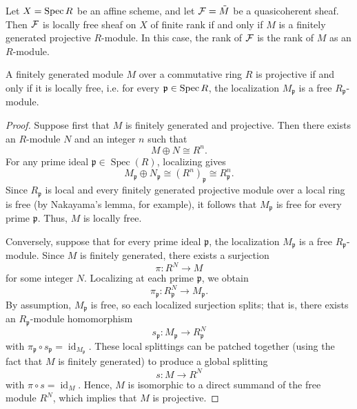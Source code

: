 \documentclass[12pt]{article}
\begin{document}
\begin{proposition}
    Let $X = \operatorname{Spec} R$ be an affine scheme, and let ${\mathcal{F}} = \tilde M$ be a quasicoherent sheaf. Then ${\mathcal{F}}$ is locally free sheaf on $X$ of finite rank if and only if $M$ is a finitely generated projective $R$-module. In this case, the rank of ${\mathcal{F}}$ is the rank of $M$ as an $R$-module.
\end{proposition}

\begin{theorem}
    A finitely generated module $M$ over a commutative ring $R$ is projective if and only if it is locally free, i.e. for every $\mathfrak{p} \in \operatorname{Spec} R$, the localization $M_{\mathfrak{p}}$ is a free $R_{\mathfrak{p}}$-module.
\end{theorem}

\begin{proof}
    Suppose first that $M$ is finitely generated and projective. Then there exists an $R$-module $N$ and an integer $n$ such that
    $$
        M \oplus N \cong R^n.
    $$
    For any prime ideal $\mathfrak{p} \in \operatorname{Spec}(R)$, localizing gives
    $$
        M_{\mathfrak{p}} \oplus N_{\mathfrak{p}} \cong (R^n)_{\mathfrak{p}} \cong R_{\mathfrak{p}}^n.
    $$
    Since $R_{\mathfrak{p}}$ is local and every finitely generated projective module over a local ring is free (by Nakayama's lemma, for example), it follows that $M_{\mathfrak{p}}$ is free for every prime $\mathfrak{p}$. Thus, $M$ is locally free.

    Conversely, suppose that for every prime ideal $\mathfrak{p}$, the localization $M_{\mathfrak{p}}$ is a free $R_{\mathfrak{p}}$-module. Since $M$ is finitely generated, there exists a surjection
    $$
        \pi \colon R^N \to M
    $$
    for some integer $N$. Localizing at each prime $\mathfrak{p}$, we obtain
    $$
        \pi_{\mathfrak{p}} \colon R_{\mathfrak{p}}^N \to M_{\mathfrak{p}}.
    $$
    By assumption, $M_{\mathfrak{p}}$ is free, so each localized surjection splits; that is, there exists an $R_{\mathfrak{p}}$-module homomorphism
    $$
        s_{\mathfrak{p}} \colon M_{\mathfrak{p}} \to R_{\mathfrak{p}}^N
    $$
    with $\pi_{\mathfrak{p}} \circ s_{\mathfrak{p}} = \operatorname{id}_{M_{\mathfrak{p}}}$. These local splittings can be patched together (using the fact that $M$ is finitely generated) to produce a global splitting
    $$
        s \colon M \to R^N
    $$
    with $\pi \circ s = \operatorname{id}_M$. Hence, $M$ is isomorphic to a direct summand of the free module $R^N$, which implies that $M$ is projective.
\end{proof}
\end{document}
